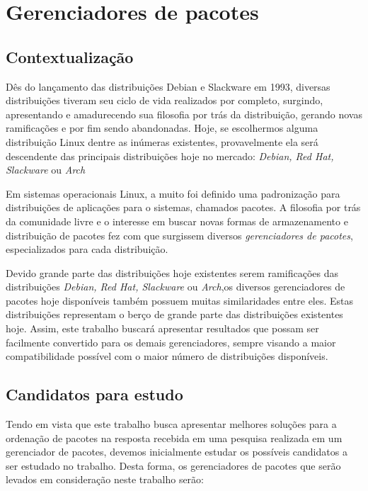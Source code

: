 \chapter{Gerenciadores de pacotes} %
\label{sec:distribui_es_abordadas}

\section{Contextualização} %
\label{sec:breve_descri_o}

Dês do lançamento das distribuições Debian e Slackware em 1993, diversas distribuições tiveram seu ciclo de vida realizados por completo, surgindo, apresentando e amadurecendo sua filosofia por trás da distribuição, gerando novas ramificações e por fim sendo abandonadas. Hoje, se escolhermos alguma distribuição Linux dentre as inúmeras existentes, provavelmente ela será descendente das principais distribuições hoje no mercado: \textit{Debian, Red Hat, Slackware} ou \textit{Arch}

Em sistemas operacionais Linux, a muito foi definido uma padronização para distribuições de aplicações para o sistemas, chamados pacotes. A filosofia por trás da comunidade livre e o interesse em buscar novas formas de armazenamento e distribuição de pacotes fez com que surgissem diversos \textit{gerenciadores de pacotes}, especializados para cada distribuição.

Devido grande parte das distribuições hoje existentes serem ramificações das distribuições \textit{Debian, Red Hat, Slackware} ou \textit{Arch},os diversos gerenciadores de pacotes hoje disponíveis também possuem muitas similaridades entre eles.
Estas distribuições representam o berço de grande parte das distribuições existentes hoje. Assim, este trabalho buscará apresentar resultados que possam ser facilmente convertido para os demais gerenciadores, sempre visando a maior compatibilidade possível com o maior número de distribuições disponíveis.

\section{Candidatos para estudo} %
\label{sec:candidatos_para_estudo}

Tendo em vista que este trabalho busca apresentar melhores soluções para a ordenação de pacotes na resposta recebida em uma pesquisa realizada em um gerenciador de pacotes, devemos inicialmente estudar os possíveis candidatos a ser estudado no trabalho.
Desta forma, os gerenciadores de pacotes que serão levados em consideração neste trabalho serão:

